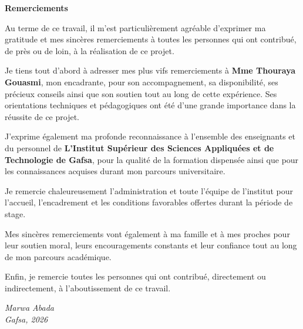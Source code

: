 \documentclass[12pt,a4paper]{report}
\begin{document}
\vfill\null
\newpage

\thispagestyle{empty}
\begin{center}
  {\Large\bfseries Remerciements}\\[0.6cm]
\end{center}
\vspace{0.8cm}

Au terme de ce travail, il m'est particulièrement agréable d'exprimer ma
gratitude et mes sincères remerciements à toutes les personnes qui ont
contribué, de près ou de loin, à la réalisation de ce projet.

Je tiens tout d'abord à adresser mes plus vifs remerciements à
\textbf{Mme Thouraya Gouasmi}, mon encadrante, pour son accompagnement,
sa disponibilité, ses précieux conseils ainsi que son soutien tout au long
de cette expérience. Ses orientations techniques et pédagogiques ont été
d'une grande importance dans la réussite de ce projet.

J'exprime également ma profonde reconnaissance à l'ensemble des enseignants
et du personnel de \textbf{L’Institut Supérieur des Sciences Appliquées et de Technologie de Gafsa}, pour la qualité de la
formation dispensée ainsi que pour les connaissances acquises durant mon
parcours universitaire.

Je remercie chaleureusement l'administration et toute l'équipe de
l'institut pour l'accueil, l'encadrement et les conditions favorables
offertes durant la période de stage.

Mes sincères remerciements vont également à ma famille et à mes proches
pour leur soutien moral, leurs encouragements constants et leur confiance
tout au long de mon parcours académique.

Enfin, je remercie toutes les personnes qui ont contribué, directement ou
indirectement, à l'aboutissement de ce travail.

\vspace{1cm}
\begin{flushright}
\itshape Marwa Abada\\
Gafsa, 2026
\end{flushright}

\newpage

\tableofcontents
\listoftables
\listoffigures
\end{document}
